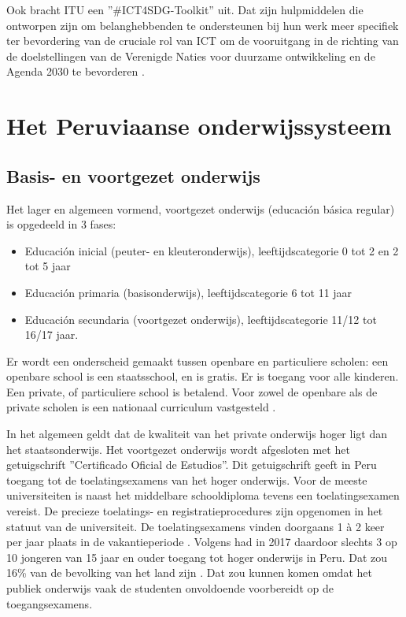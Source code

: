 Ook bracht ITU een ''\#ICT4SDG-Toolkit'' uit. Dat zijn hulpmiddelen die ontworpen zijn om belanghebbenden te ondersteunen bij hun werk meer specifiek ter bevordering van de cruciale rol van ICT om de vooruitgang in de richting van de doelstellingen van de Verenigde Naties voor duurzame ontwikkeling en de Agenda 2030 te bevorderen \autocite{ITU2015}.
 
\section{Het Peruviaanse onderwijssysteem}
\subsection{Basis- en voortgezet onderwijs}
Het lager en algemeen vormend, voortgezet onderwijs (educación básica regular) is opgedeeld in 3 fases:
 \begin{itemize}
\item Educación inicial (peuter- en kleuteronderwijs), leeftijdscategorie 0 tot 2 en 2 tot 5 jaar
\item Educación primaria (basisonderwijs), leeftijdscategorie 6 tot 11 jaar
\item Educación secundaria (voortgezet onderwijs), leeftijdscategorie 11/12 tot 16/17 jaar.
\end{itemize}
Er wordt een onderscheid gemaakt tussen openbare en particuliere scholen: een openbare school is een staatsschool, en is gratis. Er is toegang voor alle kinderen. Een private, of particuliere school is betalend. Voor zowel de openbare als de private scholen is een nationaal curriculum vastgesteld \autocite{Nuffic2015}.

In het algemeen geldt dat de kwaliteit van het private onderwijs hoger ligt dan het staatsonderwijs. Het voortgezet onderwijs wordt afgesloten met het getuigschrift ''Certificado Oficial de Estudios''. Dit getuigschrift geeft in Peru toegang tot de toelatingsexamens van het hoger onderwijs. Voor de meeste universiteiten is naast het middelbare schooldiploma tevens een toelatingsexamen vereist. De precieze toelatings- en registratieprocedures zijn opgenomen in het statuut van de universiteit. De toelatingsexamens vinden doorgaans 1 à 2 keer per jaar plaats in de vakantieperiode \autocite{Nuffic2015}. Volgens \autocite{Repulbica2017} had in 2017 daardoor slechts 3 op 10 jongeren van 15 jaar en ouder toegang tot hoger onderwijs in Peru. Dat zou 16\% van de bevolking van het land zijn \autocite{NoSeQueEstudiar2020}. Dat zou kunnen komen omdat het publiek onderwijs vaak de studenten onvoldoende voorbereidt op de toegangsexamens.

